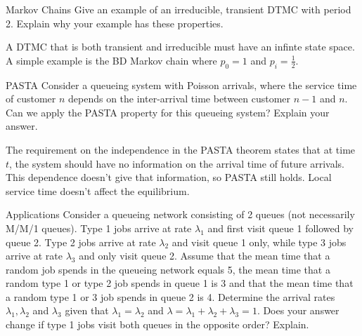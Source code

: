 \begin{problem}{Markov Chains}
Give an example of an irreducible, transient DTMC with period 2. Explain why your example has these properties.
\end{problem}
\begin{solution}
    A DTMC that is both transient and irreducible must have an infinte state space. A simple example is the BD Markov chain where $p_0 = 1$ and $p_i = \frac{1}{2}$.
\end{solution}
\begin{problem}{PASTA}
Consider a queueing system with Poisson arrivals, where the service time of customer \( n \) depends on the inter-arrival time between customer \( n - 1 \) and \( n \). Can we apply the PASTA property for this queueing system? Explain your answer.
\end{problem}

\begin{solution}
    The requirement on the independence in the PASTA theorem states that at time $t$, the system should have no information on the arrival time of future arrivals. This dependence doesn't give that information, so PASTA still holds. Local service time doesn't affect the equilibrium.
\end{solution}

\begin{problem}{Applications}
Consider a queueing network consisting of 2 queues (not necessarily M/M/1 queues). Type 1 jobs arrive at rate \( \lambda_1 \) and first visit queue 1 followed by queue 2. Type 2 jobs arrive at rate \( \lambda_2 \) and visit queue 1 only, while type 3 jobs arrive at rate \( \lambda_3 \) and only visit queue 2. Assume that the mean time that a random job spends in the queueing network equals 5, the mean time that a random type 1 or type 2 job spends in queue 1 is 3 and that the mean time that a random type 1 or 3 job spends in queue 2 is 4. Determine the arrival rates \( \lambda_1, \lambda_2 \) and \( \lambda_3 \) given that \( \lambda_1 = \lambda_2 \) and \( \lambda = \lambda_1 + \lambda_2 + \lambda_3 = 1 \). Does your answer change if type 1 jobs visit both queues in the opposite order? Explain.
\end{problem}

